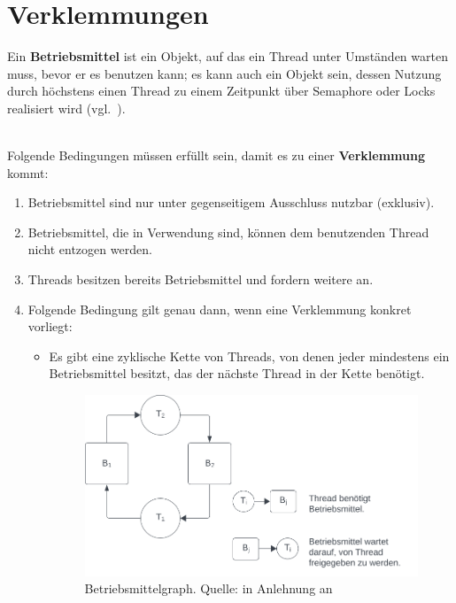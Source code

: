 \section{Verklemmungen}\label{sec:deadlockreason}

\begin{tcolorbox}[enlarge top by=0.5cm,enlarge bottom by=0.5cm]
    Ein \textbf{Betriebsmittel} ist ein Objekt, auf das ein Thread unter Umständen warten muss, bevor er es benutzen kann; es kann auch ein Objekt sein, dessen Nutzung durch höchstens einen Thread zu einem Zeitpunkt über Semaphore oder Locks realisiert wird (vgl.~\cite[186]{Oec22}).
\end{tcolorbox}\\

\noindent
Folgende Bedingungen müssen erfüllt sein, damit es zu einer \textbf{Verklemmung} kommt:

\begin{enumerate}
    \item Betriebsmittel sind nur unter gegenseitigem Ausschluss nutzbar (exklusiv).
    \item Betriebsmittel, die in Verwendung sind, können dem benutzenden Thread nicht entzogen werden.
    \item Threads besitzen bereits Betriebsmittel und fordern weitere an.
    \item Folgende Bedingung gilt genau dann, wenn eine Verklemmung konkret vorliegt:
    \begin{itemize}
        \item[] Es gibt eine zyklische Kette von Threads, von denen jeder mindestens ein Betriebsmittel besitzt, das der nächste Thread in der Kette benötigt.
         \begin{figure}
            \centering
            \includegraphics[scale=0.4]{chapters/fopt2/img/cyclic}
            \caption{Betriebsmittelgraph. Quelle: in Anlehnung an \cite[192, Bild 3.9]{Oec22}}
            \label{fig:cyclic}
        \end{figure}
    \end{itemize}
\end{enumerate}


